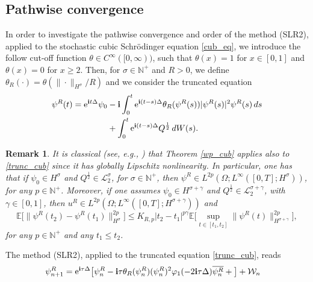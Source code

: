 \documentclass[a4paper]{amsart}
\newtheorem{remark}{Remark}[section]
\begin{document}
\subsection{Pathwise convergence}
In order to investigate the pathwise convergence and order of the method (SLR2), applied to the stochastic cubic Schrödinger equation \eqref{cub_eq}, we introduce the follow cut-off function $\theta\in C^\infty([0,\infty))$, such that $\theta(x)=1$ for $x\in[0,1]$ and $\theta(x)=0$ for $x\ge 2$. Then, for $\sigma\in\mathbb{N}^+$ and $R>0$, we define $\theta_R(\cdot)=\theta(\|\cdot\|_{H^\sigma}/R)$ and we consider the truncated equation
\begin{align}
\psi^R(t)={\rm e}^{{\bf i}t\Delta}\psi_0&-{\bf i}\int_0^t {\rm e}^{{\bf i}(t-s)\Delta} \theta_R(\psi^R(s))|\psi^R(s)|^2 \psi^R(s)\,ds\notag \\
&+\int_0^t {\rm e}^{{\bf i}(t-s)\Delta} Q^{\frac{1}{2}}\,dW(s) \label{trunc_cub}.
\end{align}
\begin{remark}
    It is classical (see, e.g., \cite{deb0}) that Theorem \ref{wp_cub} applies also to \eqref{trunc_cub} since it has globally Lipschitz nonlinearity. In particular, one has that if $\psi_0\in H^\sigma$ and $Q^{\frac{1}{2}}\in\mathcal{L}_2^\sigma$, for $\sigma\in\mathbb{N}^+$, then $\psi^R \in L^{2p}(\Omega; L^\infty([0,T];H^\sigma))$, for any $p\in\mathbb{N}^+$. Moreover, if one assumes $\psi_0\in H^{\sigma+\gamma}$ and $Q^{\frac{1}{2}}\in\mathcal{L}_2^{\sigma+\gamma}$, with $\gamma\in[0,1]$, then $u^R \in L^{2p}(\Omega; L^\infty([0,T];H^{\sigma+\gamma}))$ and
\begin{equation}
    \label{time_reg_trunc}
    \mathbb{E}\big[\|\psi^R(t_2)-\psi^R(t_1)\|^{2p}_{H^\sigma}\big]\le K_{R,p}|t_2-t_1|^{p\gamma}\mathbb{E}\big[\displaystyle\sup_{t\in[t_1,t_2]}\|\psi^R(t)\|_{H^{\sigma+\gamma}}^{2p}\big],
\end{equation}
for any $p\in\mathbb{N}^+$ and any $t_1\le t_2$. 
\end{remark}
The method (SLR2), applied to the truncated equation \eqref{trunc_cub}, reads
 \begin{align}
 \label{trunc_met}
    \psi^R_{n+1}&={\rm e}^{{\bf i}\tau\Delta}\big[\psi_n^R-{\bf i}\tau \theta_R(\psi^R_n) (\psi_n^R)^2\varphi_1(-2{\bf i}\tau\Delta)\overline{\psi_n^R}+\big]+\mathcal{W}_n\notag
      \end{align}
\end{document}
